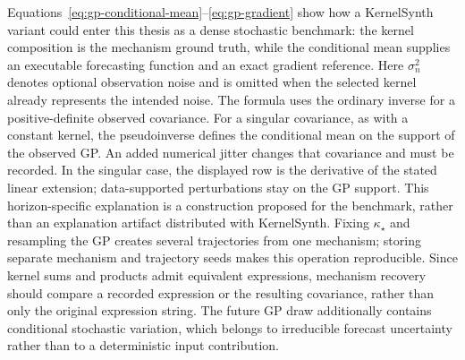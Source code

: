 Equations~\eqref{eq:gp-conditional-mean}--\eqref{eq:gp-gradient} show how a
KernelSynth variant could enter this thesis as a dense stochastic benchmark:
the kernel composition is the mechanism ground truth, while the conditional
mean supplies an executable forecasting function and an exact gradient
reference. Here $\sigma_n^2$ denotes optional observation noise and is omitted
when the selected kernel already represents the intended noise. The
formula uses the ordinary inverse for a positive-definite observed
covariance. For a singular covariance, as with a constant kernel, the
pseudoinverse defines the conditional mean on the support of the observed
GP. An added numerical jitter changes that covariance and must be recorded.
In the singular case, the displayed row is the derivative of the stated
linear extension; data-supported perturbations stay on the GP support.
This
horizon-specific explanation is a construction proposed for the benchmark,
rather than an explanation artifact distributed with KernelSynth. Fixing
$\kappa_\star$ and resampling the GP creates several trajectories from one
mechanism; storing separate mechanism and trajectory seeds makes this operation
reproducible. Since kernel sums and products admit equivalent expressions,
mechanism recovery should compare a recorded expression or the resulting
covariance, rather than only the original expression string. The future GP
draw additionally contains conditional stochastic variation, which belongs to
irreducible forecast uncertainty rather than to a deterministic input
contribution.

